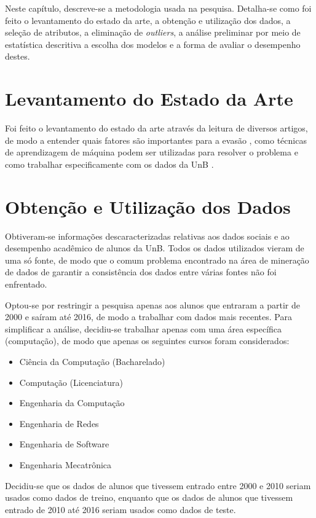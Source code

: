 Neste capítulo, descreve-se a metodologia usada na pesquisa. 
Detalha-se como foi feito o levantamento
do estado da arte, a obtenção e utilização dos dados, a seleção de
atributos, a eliminação de \textit{outliers}, a análise preliminar por meio de estatística
descritiva a escolha dos modelos e a forma de avaliar o desempenho destes.  

\section{Levantamento do Estado da Arte}
Foi feito o levantamento do estado da arte através da leitura de diversos artigos, de
modo a entender quais fatores são importantes para a evasão \cite{adeodato}
\cite{hoed_fatores} \cite{dropout_finland}, como técnicas de
aprendizagem de máquina podem ser utilizadas para resolver o problema \cite{adeodato}
 \cite{data_mining_retention} 
e como trabalhar especificamente com os dados da UnB \cite{manual_calouro} 
\cite{hoed_sobrevivencia}. 

\section{Obtenção e Utilização dos Dados}
Obtiveram-se informações descaracterizadas relativas aos dados sociais e ao
desempenho acadêmico de alunos da UnB. Todos os dados utilizados vieram de uma só
fonte, de modo que o comum problema encontrado na área de mineração de dados de
garantir a consistência dos dados entre várias fontes não foi enfrentado. 
\par Optou-se por restringir a pesquisa apenas aos alunos que entraram a partir de
2000 e saíram até 2016, de modo a trabalhar com dados mais recentes. 
Para simplificar a análise, decidiu-se trabalhar apenas com uma área
específica (computação), de modo que apenas os seguintes cursos foram considerados: 
\begin{itemize}
    \item Ciência da Computação (Bacharelado)
    \item Computação (Licenciatura)
    \item Engenharia da Computação 
    \item Engenharia de Redes
    \item Engenharia de Software
    \item Engenharia Mecatrônica
\end{itemize}
\par Decidiu-se que os dados de alunos que tivessem entrado entre 2000 e 2010 seriam
usados como dados de treino, enquanto que os dados de alunos que tivessem entrado de
2010 até 2016 seriam usados como dados de teste.

